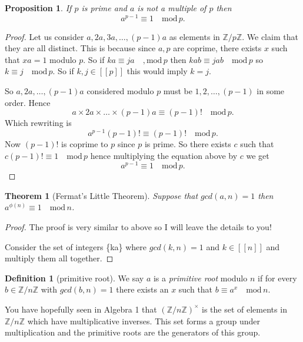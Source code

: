 \documentclass[
]{book}
\newtheorem{theorem}{Theorem}[chapter]
\newtheorem{proposition}{Proposition}[chapter]
\theoremstyle{definition}
\newtheorem{definition}{Definition}[chapter]
\theoremstyle{definition}
\theoremstyle{definition}
\theoremstyle{definition}
\theoremstyle{remark}
\begin{document}
\begin{proposition}
If \(p\) is prime and \(a\) is not a multiple of \(p\) then
\[ a^{p-1} \equiv 1 \quad \mbox{mod} \, p.  \]
\end{proposition}

\begin{proof}
Let us consider \(a, 2a, 3a, \dots, (p-1)a\) as elements in \(\mathbb{Z}/p\mathbb{Z}\). We claim that they are all distinct. This is because since \(a,p\) are coprime, there exists \(x\) such that \(xa =1\) modulo \(p\). So if \(ka \equiv ja \quad, \mbox{mod} \,p\) then \(kab \equiv jab \quad \mbox{mod} \, p\) so \(k \equiv j \quad \mbox{mod}\, p\). So if \(k, j \in [[p]]\) this would imply \(k = j\).

So \(a, 2a, \dots, (p-1)a\) considered modulo \(p\) must be \(1, 2, \dots, (p-1)\) in some order. Hence
\[ a \times 2a \times \dots \times (p-1)a \equiv (p-1)! \quad \mbox{mod}\, p. \] Which rewriting is
\[ a^{p-1} (p-1)! \equiv (p-1)! \quad \mbox{mod} \, p. \] Now \((p-1)!\) is coprime to \(p\) since \(p\) is prime. So there exists \(c\) such that \(c(p-1)! \equiv 1 \quad \mbox{mod}\, p\) hence multiplying the equation above by \(c\) we get
\[ a^{p-1} \equiv 1 \quad \mbox{mod} \, p.  \]
\end{proof}

\begin{theorem}[Fermat's Little Theorem]
Suppose that \(gcd(a,n) =1\) then \(a^{\phi(n)} \equiv 1 \quad \mbox{mod} \, n\).
\end{theorem}

\begin{proof}
The proof is very similar to above so I will leave the details to you!

Consider the set of integers \{ka\} where \(gcd(k,n) =1\) and \(k \in [[n]]\) and multiply them all together.
\end{proof}

\begin{definition}[primitive root]
We say \(a\) is a \emph{primitive root} modulo \(n\) if for every \(b \in \mathbb{Z}/n\mathbb{Z}\) with \(gcd(b,n)=1\) there exists an \(x\) such that \(b \equiv a^x \quad \mbox{mod}\, n\).
\end{definition}

You have hopefully seen in Algebra 1 that \((\mathbb{Z}/n\mathbb{Z})^{\times}\) is the set of elements in \(\mathbb{Z}/n\mathbb{Z}\) which have multiplicative inverses. This set forms a group under multiplication and the primitive roots are the generators of this group.
\end{document}
